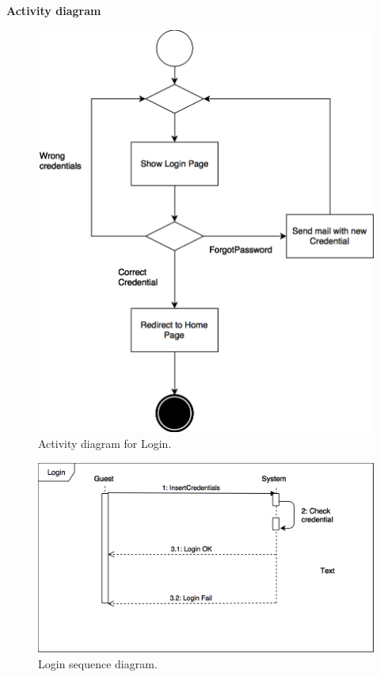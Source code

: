\documentclass{article}
\begin{document}
	\newpage
	\noindent
	\textbf{Activity diagram} \\
	
	\begin{figure}[h!]
		\bigskip
		\centering
		\includegraphics[scale=0.25]{img/diagrams/login_ad.png}
		\caption{Activity diagram for Login.}
	\end{figure}
	\begin{figure}[h!]
		\bigskip
		\centering
		\includegraphics[scale=0.25]{img/diagrams/login_sd.png}
		\caption{Login sequence diagram.}
	\end{figure}
\end{document}
